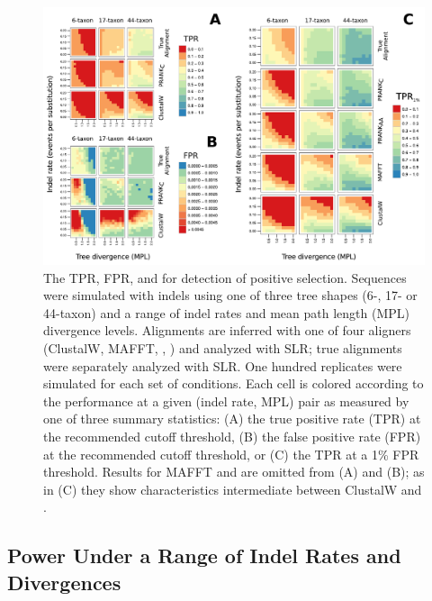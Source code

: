 \begin{figure}[t!]
\centering
\includegraphics[scale=0.8]{Figs/fig4.pdf}
\caption{The TPR, FPR, and \tpr for \sw detection of positive
  selection. Sequences were simulated with indels using one of three
  tree shapes (6-, 17- or 44-taxon) and a range of indel rates and
  mean path length (MPL) divergence levels. Alignments are inferred
  with one of four aligners (ClustalW, MAFFT, \pranka{}, \prankc) and
  analyzed with SLR; true alignments were separately analyzed with
  SLR. One hundred replicates were simulated for each set of
  conditions. Each cell is colored according to the performance at a
  given (indel rate, MPL) pair as measured by one of three summary
  statistics: (A) the true positive rate (TPR) at the recommended
  cutoff threshold, (B) the false positive rate (FPR) at the
  recommended cutoff threshold, or (C) the TPR at a 1\% FPR
  threshold. Results for MAFFT and \pranka are omitted from (A) and
  (B); as in (C) they show characteristics intermediate between
  ClustalW and \prankc.}
\label{fig_4}
\end{figure}

\subsection{\Sw Power Under a Range of Indel Rates and Divergences}

